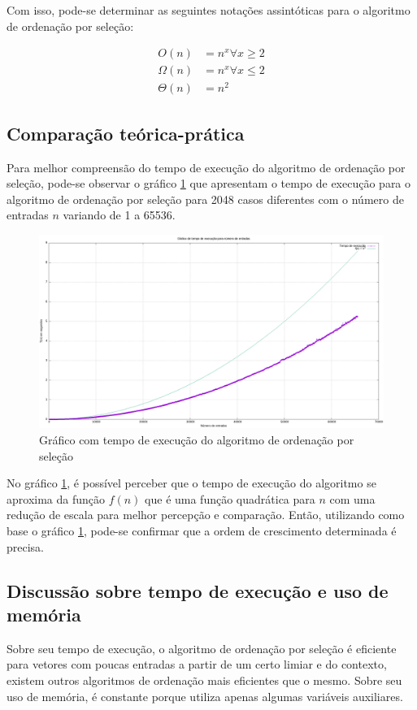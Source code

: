 Com isso, pode-se determinar as seguintes notações assintóticas para o algoritmo de ordenação 
por seleção:

\begin{align*} \label{cap:2:eq:selectionSort:3}
    O(n) &= n^x \forall x \geq 2 \\ 
    \Omega(n) &= n^x \forall x \leq 2 \\
    \Theta(n) &= n^2
\end{align*}

\subsection{Comparação teórica-prática}

Para melhor compreensão do tempo de execução do algoritmo de ordenação por seleção, pode-se observar o gráfico 
\ref{cap:2:graph:selectionSort} que apresentam o tempo de execução para o algoritmo de ordenação por seleção
para 2048 casos diferentes com o número de entradas $n$ variando de 1 a 65536.

\begin{figure}[h]
    \centering
    \includegraphics[width=\textwidth]{image/graphics/selectionSort.png}
    \caption{Gráfico com tempo de execução do algoritmo de ordenação por seleção}
    \label{cap:2:graph:selectionSort}
\end{figure}

No gráfico \ref{cap:2:graph:selectionSort}, é possível perceber que o tempo de execução do algoritmo se aproxima
da função $f(n)$ que é uma função quadrática para $n$ com uma redução de escala para melhor percepção e comparação. Então,
utilizando como base o gráfico \ref{cap:2:graph:selectionSort}, pode-se confirmar que a ordem de crescimento determinada é
precisa.

\subsection{Discussão sobre tempo de execução e uso de memória}

Sobre seu tempo de execução, o algoritmo de ordenação por seleção é eficiente para vetores
com poucas entradas a partir de um certo limiar e do contexto, existem outros algoritmos de ordenação
mais eficientes que o mesmo. Sobre seu uso de memória, é constante porque utiliza apenas algumas variáveis
auxiliares.

